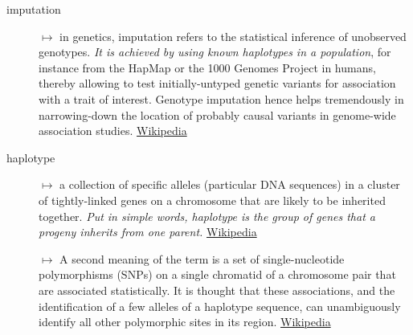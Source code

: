 \documentclass[letterpaper]{scrartcl}
\begin{document}
\begin{description}
\item[imputation]
\(\mapsto\) in genetics, imputation refers to the statistical inference
of unobserved genotypes. \emph{It is achieved by using known haplotypes
in a population}, for instance from the HapMap or the 1000 Genomes
Project in humans, thereby allowing to test initially-untyped genetic
variants for association with a trait of interest. Genotype imputation
hence helps tremendously in narrowing-down the location of probably
causal variants in genome-wide association studies.
\href{http://en.wikipedia.org/wiki/Imputation_(genetics)}{Wikipedia}
\item[haplotype]
\(\mapsto\) a collection of specific alleles (particular DNA sequences)
in a cluster of tightly-linked genes on a chromosome that are likely to
be inherited together. \emph{Put in simple words, haplotype is the group
of genes that a progeny inherits from one parent.}
\href{link_addresshttp://en.wikipedia.org/wiki/Haplotype}{Wikipedia}

\(\mapsto\) A second meaning of the term is a set of single-nucleotide
polymorphisms (SNPs) on a single chromatid of a chromosome pair that are
associated statistically. It is thought that these associations, and the
identification of a few alleles of a haplotype sequence, can
unambiguously identify all other polymorphic sites in its region.
\href{link_addresshttp://en.wikipedia.org/wiki/Haplotype}{Wikipedia}


\end{description}
\end{document}
